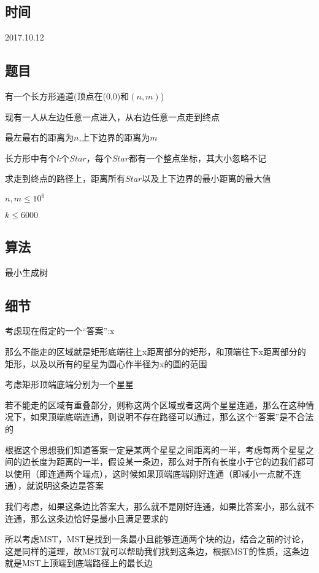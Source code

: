 \documentclass[a4paper]{article}
\begin{document}
	\subsection{时间}
		
		2017.10.12
		
	\subsection{题目}
		
		有一个长方形通道(顶点在(0,0)和$(n,m)$)
		
		现有一人从左边任意一点进入，从右边任意一点走到终点
		
		最左最右的距离为$n$,上下边界的距离为$m$
		
		长方形中有个$k$个$Star$，每个$Star$都有一个整点坐标，其大小忽略不记
		
		求走到终点的路径上，距离所有$Star$以及上下边界的最小距离的最大值
		
		$n,m \leq 10^6$
		
		$k \leq 6000$
		
	\subsection{算法}
		
		最小生成树
		
	\subsection{细节}
		
		考虑现在假定的一个“答案”:x
		
		那么不能走的区域就是矩形底端往上x距离部分的矩形，和顶端往下x距离部分的矩形，以及以所有的星星为圆心作半径为x的圆的范围
		
		考虑矩形顶端底端分别为一个星星
		
		若不能走的区域有重叠部分，则称这两个区域或者这两个星星连通，那么在这种情况下，如果顶端底端连通，则说明不存在路径可以通过，那么这个“答案”是不合法的
		
		根据这个思想我们知道答案一定是某两个星星之间距离的一半，考虑每两个星星之间的边长度为距离的一半，假设某一条边，那么对于所有长度小于它的边我们都可以使用（即连通两个端点），这时候如果顶端底端刚好连通（即减小一点就不连通），就说明这条边是答案
		
		我们考虑，如果这条边比答案大，那么就不是刚好连通，如果比答案小，那么就不连通，那么这条边恰好是最小且满足要求的
		
		所以考虑MST，MST是找到一条最小且能够连通两个块的边，结合之前的讨论，这是同样的道理，故MST就可以帮助我们找到这条边，根据MST的性质，这条边就是MST上顶端到底端路径上的最长边
		
\end{document}
